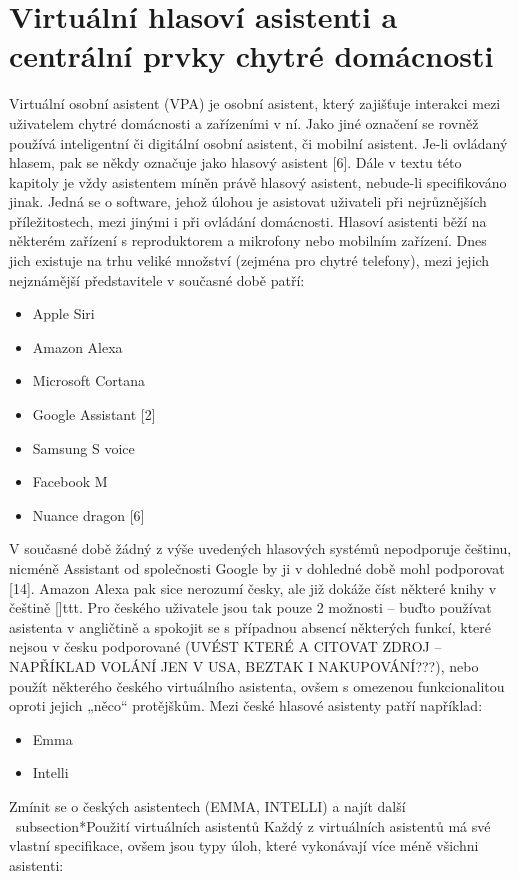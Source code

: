 \section{Virtuální hlasoví asistenti a centrální prvky chytré domácnosti}
Virtuální osobní asistent (VPA) je osobní asistent, který zajišťuje interakci mezi uživatelem chytré domácnosti a zařízeními v ní. Jako jiné označení se rovněž používá inteligentní či digitální osobní asistent, či mobilní asistent. Je-li ovládaný hlasem, pak se někdy označuje jako hlasový asistent [6]. Dále v textu této kapitoly je vždy asistentem míněn právě hlasový asistent, nebude-li specifikováno jinak. Jedná se o software, jehož úlohou je asistovat uživateli při nejrůznějších příležitostech, mezi jinými i při ovládání domácnosti. Hlasoví asistenti běží na některém zařízení s reproduktorem a mikrofony nebo mobilním zařízení. Dnes jich existuje na trhu veliké množství (zejména pro chytré telefony), mezi jejich nejznámější představitele v současné době patří:
\begin{itemize}
\item Apple Siri
\item Amazon Alexa
\item Microsoft Cortana
\item Google Assistant [2]
\item Samsung S voice
\item Facebook M
\item Nuance dragon [6]
\end{itemize}
V současné době žádný z výše uvedených hlasových systémů nepodporuje češtinu, nicméně Assistant od společnosti Google by ji v dohledné době mohl podporovat [14]. Amazon Alexa pak sice nerozumí česky, ale již dokáže číst některé knihy v češtině []ttt. Pro českého uživatele jsou tak pouze 2 možnosti – buďto používat asistenta v angličtině a spokojit se s případnou absencí některých funkcí, které nejsou v česku podporované (UVÉST KTERÉ A CITOVAT ZDROJ – NAPŘÍKLAD VOLÁNÍ JEN V USA, BEZTAK I NAKUPOVÁNÍ???), nebo použít některého českého virtuálního asistenta, ovšem s omezenou funkcionalitou oproti jejich „něco“ protějškům. Mezi české hlasové asistenty patří například:
\begin{itemize}
\item Emma
\item Intelli
\end{itemize}
Zmínit se o českých asistentech (EMMA, INTELLI) a najít další
\ subsection*{Použití virtuálních asistentů}
Každý z virtuálních asistentů má své vlastní specifikace, ovšem jsou typy úloh, které vykonávají více méně všichni asistenti:
